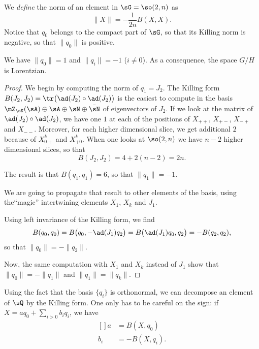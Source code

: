 We \emph{define} the norm of an element in $\sG=\so(2,n)$ as
\begin{equation}	\label{LONGEqDefNormeKillingSix}
	\| X \|=-\frac{ 1 }{2n}B(X,X).
\end{equation}
Notice that $q_0$ belongs to the compact part of $\sG$, so that its Killing norm is negative, so that $\| q_0 \|$ is positive.


\begin{proposition}		\label{LONGPropBaseQOrtho}
	We have $\| q_0 \|=1$ and $\| q_i \|=-1$ ($i\neq 0$). As a consequence, the space $G/H$ is Lorentzian.
\end{proposition}


\begin{proof}
	We begin by computing the norm of $q_1=J_2$. The Killing form $B(J_2,J_2)=\tr\big( \ad(J_2)\circ\ad(J_2) \big)$ is the easiest to compute in the basis $\mZ_{\sK}(\sA)\oplus\sA\oplus\sN\oplus\bar\sN$ of eigenvectors of $J_2$. If we look at the matrix of $\ad(J_2)\circ\ad(J_2)$, we have one $1$ at each of the positions of $X_{++}$, $X_{+-}$, $X_{-+}$ and $X_{--}$. Moreover, for each higher dimensional slice, we get additional $2$ because of $X_{0+}^k$ and $X_{+0}^k$. When one looks at $\so(2,n)$ we have $n-2$ higher dimensional slices, so that
	\begin{equation}
		B(J_2,J_2)=4+2(n-2)=2n.
	\end{equation}

	The result is that $B(q_1,q_1)=6$, so that $\| q_1 \|=-1$.

	We are going to propagate that result to other elements of the basis, using the``magic'' intertwining elements $X_1$, $X_k$ and $J_1$.

	Using left invariance of the Killing form, we find
	\begin{equation}		\label{LONGEqCalculBBBqZeroqUnNirme}
		B(q_0,q_0)=B\big( q_0,-\ad(J_1)q_2 \big)=B\big( \ad(J_1)q_0,q_2 \big)=-B(q_2,q_2),
	\end{equation}
	so that $\| q_0 \| =-\| q_2 \|$.

	Now, the same computation with $X_1$ and $X_k$ instead of $J_1$ show that $\| q_0 \|=-\| q_1 \|$ and $\| q_1 \|=\| q_k \|$.
\end{proof}



\begin{remark}		\label{LONGRemBProdScal}
	Using the fact that the basis $\{ q_i\}$ is orthonormal, we can decompose an element of $\sQ$ by the Killing form. One only has to be careful on the sign: if $X=aq_0+\sum_{i>0}b_iq_i$, we have
	\begin{equation}		\label{LONGEqsabKillProjComp}
		\begin{aligned}[]
			a&=B(X,q_0)\\
			b_i&=-B(X,q_i).
		\end{aligned}
	\end{equation}
\end{remark}


